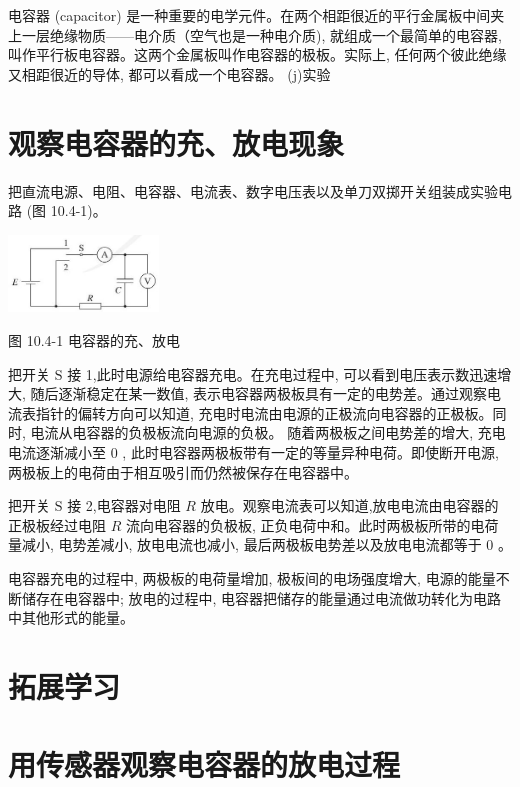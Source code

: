 \documentclass[10pt]{article}
\begin{document}
电容器 (capacitor) 是一种重要的电学元件。在两个相距很近的平行金属板中间夹上一层绝缘物质——电介质（空气也是一种电介质), 就组成一个最简单的电容器, 叫作平行板电容器。这两个金属板叫作电容器的极板。实际上, 任何两个彼此绝缘又相距很近的导体, 都可以看成一个电容器。 (j)实验

\section*{观察电容器的充、放电现象}

把直流电源、电阻、电容器、电流表、数字电压表以及单刀双掷开关组装成实验电路 (图 10.4-1)。

\begin{center}
\includegraphics[max width=0.3\textwidth]{images/01911d5f-8e38-70c0-b5b8-2b399bd115b6_43_231576.jpg}
\end{center}

图 10.4-1 电容器的充、放电

把开关 \(\mathrm{S}\) 接 1,此时电源给电容器充电。在充电过程中, 可以看到电压表示数迅速增大, 随后逐渐稳定在某一数值, 表示电容器两极板具有一定的电势差。通过观察电流表指针的偏转方向可以知道, 充电时电流由电源的正极流向电容器的正极板。同时, 电流从电容器的负极板流向电源的负极。 随着两极板之间电势差的增大, 充电电流逐渐减小至 0 , 此时电容器两极板带有一定的等量异种电荷。即使断开电源, 两极板上的电荷由于相互吸引而仍然被保存在电容器中。

把开关 \(\mathrm{S}\) 接 2,电容器对电阻 \(R\) 放电。观察电流表可以知道,放电电流由电容器的正极板经过电阻 \(R\) 流向电容器的负极板, 正负电荷中和。此时两极板所带的电荷量减小, 电势差减小, 放电电流也减小, 最后两极板电势差以及放电电流都等于 0 。

电容器充电的过程中, 两极板的电荷量增加, 极板间的电场强度增大, 电源的能量不断储存在电容器中; 放电的过程中, 电容器把储存的能量通过电流做功转化为电路中其他形式的能量。

\section*{拓展学习}

\section*{用传感器观察电容器的放电过程}
\end{document}

